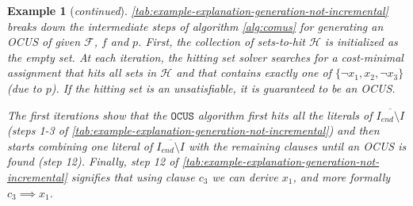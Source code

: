 \documentclass[twoside,11pt]{article}
\newcommand\m[1]{\mathcal{#1}}
\newtheorem{example}{Example}
\newcommand\comment[1]{\marginpar{\tiny #1}}
\renewcommand\comment[1]{#1}
\newcommand{\emilio}[1]{{\comment{\color{red}Emilio: #1}}}
\newcommand{\bart}[1]{{\comment{\color{OliveGreen}Bart: #1}}}
\newcommand\setstohit{\ensuremath{\m{H} }\xspace}
\newcommand\Iend{\ensuremath{I_\mathit{end} }\xspace}
\newcommand\formula{\ensuremath{\m{F} }\xspace}
\newcommand\mm[1]{\ensuremath{#1}\xspace}
\newcommand\call[1]{\mm{\texttt{#1}}}
\newcommand\sat{\texttt{{SAT}}\xspace}
\newcommand\comus{\mm{\call{OCUS}}}
\begin{document}
\begin{example}[\textit{continued}]
	\cref{tab:example-explanation-generation-not-incremental} breaks down the intermediate steps of algorithm \ref{alg:comus} for generating an OCUS of given $\formula$, $f$ and $p$. 
	First, the collection of sets-to-hit \setstohit is initialized as the empty set. At each iteration, the hitting set solver searches for a cost-minimal assignment that hits all sets in \setstohit and that contains exactly one of $\{\lnot x_1, x_2, \lnot x_3\}$ (due to $p$). If the hitting set is an unsatisfiable, it is guaranteed to be an OCUS.
	
 The first iterations show that the \comus algorithm first hits all the literals of $\overline{\Iend\setminus I}$ (steps 1-3 of \cref{tab:example-explanation-generation-not-incremental}) and then starts combining one literal of $\overline{\Iend\setminus I}$ %
  with the remaining clauses until an OCUS is found (step 12). 
  Finally, step 12 of \cref{tab:example-explanation-generation-not-incremental} signifies that using clause $c_3$ we can derive $x_1$, and more formally $c_3 \implies x_1$.

  
%
%
%
\end{example}
\end{document}
